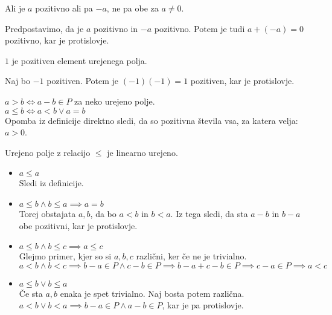 \begin{trditev}
    Ali je $a$ pozitivno ali pa $-a$, ne pa obe za $a \neq 0$.
\end{trditev}
\begin{dokaz}
    Predpostavimo, da je $a$ pozitivno in $-a$ pozitivno.
    Potem je tudi $a + (-a) = 0$ pozitivno, kar je protislovje.
\end{dokaz}

\begin{trditev}
    $1$ je pozitiven element urejenega polja.
\end{trditev}
\begin{dokaz}
    Naj bo $-1$ pozitiven.
    Potem je $(-1)(-1) = 1$ pozitiven, kar je protislovje.
\end{dokaz}

\begin{definicija}
    $a > b \iff a - b \in P$ za neko urejeno polje. \\
    $a \leq b \iff a < b \vee a = b$ \\
    Opomba iz definicije direktno sledi, da so pozitivna števila vsa, za katera velja: $a > 0$.
\end{definicija}

\begin{trditev}
    Urejeno polje z relacijo $\leq$ je linearno urejeno.
\end{trditev}
\begin{dokaz}
    \begin{itemize}
        \item $a \leq a$ \\
        Sledi iz definicije.
        \item $a \leq b \wedge b \leq a \implies a = b$ \\
        Torej obstajata $a, b$, da bo $a < b$ in $b < a$.
        Iz tega sledi, da sta $a - b$ in $b - a$ obe pozitivni, kar je protislovje.
        \item $a \leq b \wedge b \leq c \implies a \leq c$ \\
        Glejmo primer, kjer so si $a, b, c$ različni, ker če ne je trivialno.
        $a < b \wedge b < c \implies b - a \in P \wedge c - b \in P \implies b - a + c - b \in P \implies c - a \in P \implies a < c$
        \item $a \leq b \vee b \leq a$ \\
        Če sta $a, b$ enaka je spet trivialno.
        Naj bosta potem različna.
        $a < b \vee b < a \implies b - a \in P \wedge a - b \in P$, kar je pa protislovje.
    \end{itemize}
\end{dokaz}


